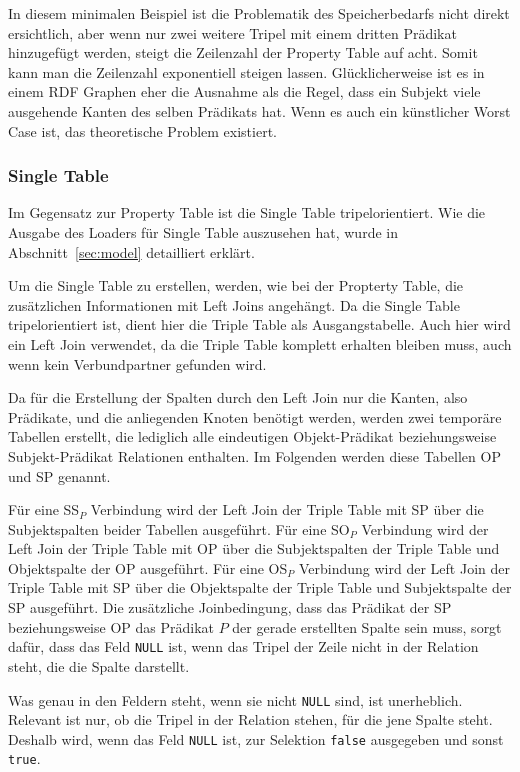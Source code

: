 \documentclass[
  a4paper,
  12pt,
  oneside,
  parskip=half,
  headsepline,
]{scrartcl}
\begin{document}
In diesem minimalen Beispiel ist die Problematik des Speicherbedarfs nicht
direkt ersichtlich, aber wenn nur zwei weitere Tripel mit einem dritten Prädikat
hinzugefügt werden, steigt die Zeilenzahl der Property Table auf acht. Somit kann
man die Zeilenzahl exponentiell steigen lassen. Glücklicherweise ist es
in einem RDF Graphen eher die Ausnahme als die Regel, dass ein Subjekt viele
ausgehende Kanten des selben Prädikats hat. Wenn es auch ein künstlicher Worst
Case ist, das theoretische Problem existiert.

\subsubsection{Single Table}

Im Gegensatz zur Property Table ist die Single Table tripelorientiert. Wie die
Ausgabe des Loaders für Single Table auszusehen hat, wurde in
Abschnitt~\ref{sec:model} detailliert erklärt.

Um die Single Table zu erstellen, werden, wie bei der Propterty Table, die
zusätzlichen Informationen mit Left Joins angehängt. Da die Single Table
tripelorientiert ist, dient hier die Triple Table als Ausgangstabelle. Auch hier
wird ein Left Join verwendet, da die Triple Table komplett erhalten bleiben muss, 
auch wenn kein Verbundpartner gefunden wird.

Da für die Erstellung der Spalten durch den Left Join nur die Kanten, also
Prädikate, und die anliegenden Knoten benötigt werden, werden zwei temporäre
Tabellen erstellt, die lediglich alle eindeutigen Objekt-Prädikat
beziehungsweise Subjekt-Prädikat Relationen enthalten. Im Folgenden werden diese
Tabellen OP und SP genannt.

Für eine SS$_{P}$ Verbindung wird der Left Join der Triple Table mit SP über
die Subjektspalten beider Tabellen ausgeführt. Für eine SO$_{P}$ Verbindung wird
der Left Join der Triple Table mit OP über die Subjektspalten der Triple
Table und Objektspalte der OP ausgeführt. Für eine OS$_{P}$ Verbindung wird der
Left Join der Triple Table mit SP über die Objektspalte der Triple Table und
Subjektspalte der SP ausgeführt. Die zusätzliche Joinbedingung, dass das
Prädikat der SP beziehungsweise OP das Prädikat $P$ der gerade erstellten Spalte
sein muss, sorgt dafür, dass das Feld \texttt{NULL} ist, wenn das Tripel der Zeile nicht
in der Relation steht, die die Spalte darstellt.

Was genau in den Feldern steht, wenn sie nicht \texttt{NULL} sind, ist
unerheblich. Relevant ist nur, ob die Tripel in der Relation stehen, für die
jene Spalte steht. Deshalb wird, wenn das Feld \texttt{NULL} ist, zur Selektion
\texttt{false} ausgegeben und sonst \texttt{true}.
\end{document}

